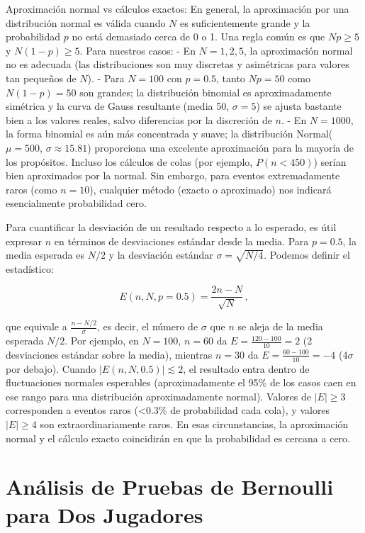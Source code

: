 \documentclass[11pt,letterpaper]{article}
\begin{document}
Aproximación normal vs cálculos exactos: En general, la aproximación por una distribución normal es válida cuando $N$ es suficientemente grande y la probabilidad $p$ no está demasiado cerca de 0 o 1. Una regla común es que $Np \ge 5$ y $N(1-p) \ge 5$. Para nuestros casos:
- En $N=1,2,5$, la aproximación normal no es adecuada (las distribuciones son muy discretas y asimétricas para valores tan pequeños de $N$).
- Para $N=100$ con $p=0.5$, tanto $Np=50$ como $N(1-p)=50$ son grandes; la distribución binomial es aproximadamente simétrica y la curva de Gauss resultante (media 50, $\sigma=5$) se ajusta bastante bien a los valores reales, salvo diferencias por la discreción de $n$.
- En $N=1000$, la forma binomial es aún más concentrada y suave; la distribución Normal($\mu=500$, $\sigma\approx15.81$) proporciona una excelente aproximación para la mayoría de los propósitos. Incluso los cálculos de colas (por ejemplo, $P(n<450)$) serían bien aproximados por la normal. Sin embargo, para eventos extremadamente raros (como $n=10$), cualquier método (exacto o aproximado) nos indicará esencialmente probabilidad cero.

Para cuantificar la desviación de un resultado respecto a lo esperado, es útil expresar $n$ en términos de desviaciones estándar desde la media. Para $p=0.5$, la media esperada es $N/2$ y la desviación estándar $\sigma=\sqrt{N/4}$. Podemos definir el estadístico:

\[ 
E(n, N, p=0.5) = \frac{2n - N}{\sqrt{N}}\,,
\]

que equivale a $\frac{n - N/2}{\sigma}$, es decir, el número de $\sigma$ que $n$ se aleja de la media esperada $N/2$. Por ejemplo, en $N=100$, $n=60$ da $E = \frac{120-100}{10} = 2$ (2 desviaciones estándar sobre la media), mientras $n=30$ da $E = \frac{60-100}{10} = -4$ (4$\sigma$ por debajo). Cuando $|E(n,N,0.5)| \lesssim 2$, el resultado entra dentro de fluctuaciones normales esperables (aproximadamente el 95\% de los casos caen en ese rango para una distribución aproximadamente normal). Valores de $|E| \ge 3$ corresponden a eventos raros (<0.3\% de probabilidad cada cola), y valores $|E| \ge 4$ son extraordinariamente raros. En esas circunstancias, la aproximación normal y el cálculo exacto coincidirán en que la probabilidad es cercana a cero.

\section{Análisis de Pruebas de Bernoulli para Dos Jugadores}
\end{document}
